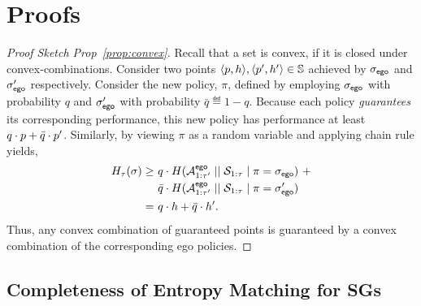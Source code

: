 \section{Proofs}\label{sec:proofs}
\begin{proof}[Proof Sketch Prop~\ref{prop:convex}]
  Recall that a set is convex, if it is closed under
  convex-combinations\footnotemark. Consider two points
  $\langle p, h \rangle, \langle p', h' \rangle \in
  \mathbb{S}$ achieved by ${\sigma_{\mathsf{ego}}}$ and ${\sigma'_{\mathsf{ego}}}$
  respectively. Consider the new policy, $\pi$, defined by employing
  ${\sigma_{\mathsf{ego}}}$ with probability $q$ and ${\sigma'_{\mathsf{ego}}}$ with
  probability $\bar{q} \eqdef 1 - q$.  Because each policy
  \emph{guarantees} its corresponding performance, this new policy has
  performance at least $q\cdot p + \bar{q}\cdot p'$.  Similarly,
  by viewing $\pi$ as a random variable and applying chain rule
  yields,
  \begin{equation}
    \begin{split}
      H_\tau(\sigma)
      \geq &~q \cdot H( {\mathcal{A}}^{\mathsf{ego}}_{1:\tau'} \mid\mid {\mathcal{S}}_{1:\tau} \mid \pi={\sigma_{\mathsf{ego}}})~+\\
      &~\bar{q}  \cdot H( {\mathcal{A}}^{\mathsf{ego}}_{1:\tau'} \mid\mid {\mathcal{S}}_{1:\tau} \mid \pi={\sigma'_{\mathsf{ego}}})\\
      =&~q\cdot h + \bar{q}\cdot h'.
    \end{split}
  \end{equation}
  Thus, any convex combination of guaranteed points is guaranteed by
  a convex combination of the corresponding ego policies.
\end{proof}


\subsection{Completeness of Entropy Matching for SGs}


